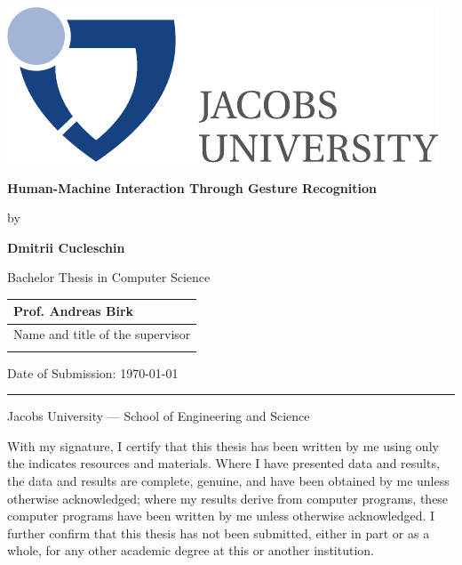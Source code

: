 \documentclass[a4paper,11pt,oneside]{article}
\newcommand{\myname}{Dmitrii Cucleschin}
\newcommand{\mytitle}{Human-Machine Interaction Through Gesture Recognition}
\newcommand{\mysupervisor}{Prof. Andreas Birk}
\begin{document}

\thispagestyle{empty}

\begin{flushright}
  \includegraphics[scale=0.7]{bsc-logo}
\end{flushright}
\vspace{20mm}
\begin{center}
  \huge
  \textbf{\mytitle}
\end{center}
\vspace*{4mm}
\begin{center}
 \Large by
\end{center}
\vspace*{4mm}
\begin{center}
  \Large
  \textbf{\myname}
\end{center}
\vspace*{20mm}
\begin{center}
  \large
  Bachelor Thesis in Computer Science
\end{center}
\vfill
\begin{flushright}
  \large
  \begin{tabular}{l}
    \mysupervisor \\
    \hline
    Name and title of the supervisor \\
    \\
  \end{tabular}
\end{flushright}
\vspace*{8mm}
\begin{flushleft}
  \large
  Date of Submission: \today \\
  \rule{\textwidth}{1pt}
\end{flushleft}
\begin{center}
  \Large Jacobs University --- School of Engineering and Science
\end{center}

\newpage
\thispagestyle{empty}

With my signature, I certify that this thesis has been written by me
using only the indicates resources and materials. Where I have
presented data and results, the data and results are complete,
genuine, and have been obtained by me unless otherwise acknowledged;
where my results derive from computer programs, these computer
programs have been written by me unless otherwise acknowledged. I
further confirm that this thesis has not been submitted, either in
part or as a whole, for any other academic degree at this or another
institution.
\end{document}
